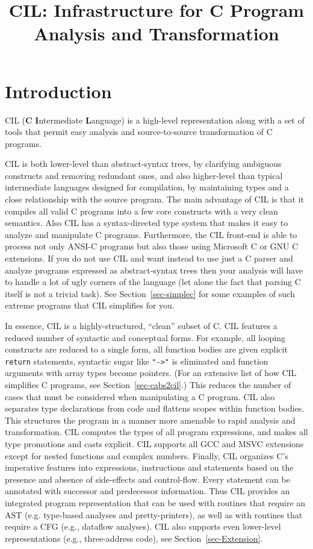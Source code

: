 \documentclass{article}
\def\secref#1{Section~\ref{sec-#1}}
\begin{document}
\begin{latexonly}
\title{CIL: Infrastructure for C Program Analysis and Transformation}
\end{latexonly}
\maketitle

\section{Introduction}

 CIL ({\bf C} {\bf I}ntermediate {\bf L}anguage) is a high-level representation
along with a set of tools that permit easy analysis and source-to-source
transformation of C programs.

 CIL is both lower-level than abstract-syntax trees, by clarifying ambiguous
constructs and removing redundant ones, and also higher-level than typical
intermediate languages designed for compilation, by maintaining types and a
close relationship with the source program. The main advantage of CIL is that
it compiles all valid C programs into a few core constructs with a very clean
semantics. Also CIL has a syntax-directed type system that makes it easy to
analyze and manipulate C programs. Furthermore, the CIL front-end is able to
process not only ANSI-C programs but also those using Microsoft C or GNU C
extensions. If you do not use CIL and want instead to use just a C parser and
analyze programs expressed as abstract-syntax trees then your analysis will
have to handle a lot of ugly corners of the language (let alone the fact that
parsing C itself is not a trivial task). See \secref{simplec} for some
examples of such extreme programs that CIL simplifies for you.

 In essence, CIL is a highly-structured, ``clean'' subset of C. CIL features a
reduced number of syntactic and conceptual forms. For example, all looping
constructs are reduced to a single form, all function bodies are given
explicit {\tt return} statements, syntactic sugar like {\tt "->"} is
eliminated and function arguments with array types become pointers. (For an
extensive list of how CIL simplifies C programs, see \secref{cabs2cil}.)
This reduces the number of cases that must be considered when manipulating a C
program. CIL also separates type declarations from code and flattens scopes
within function bodies. This structures the program in a manner more amenable
to rapid analysis and transformation. CIL computes the types of all program
expressions, and makes all type promotions and casts explicit. CIL supports
all GCC and MSVC extensions except for nested functions and complex numbers.
Finally, CIL organizes C's imperative features into expressions, instructions
and statements based on the presence and absence of side-effects and
control-flow. Every statement can be annotated with successor and predecessor
information. Thus CIL provides an integrated program representation that can
be used with routines that require an AST (e.g. type-based analyses and
pretty-printers), as well as with routines that require a CFG (e.g., dataflow
analyses). CIL also supports even lower-level representations (e.g.,
three-address code), see \secref{Extension}. 
\end{document}
